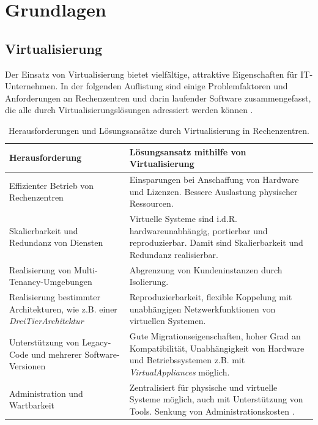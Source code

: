 \documentclass[../main.tex]{subfiles}
\begin{document}
\chapter{Grundlagen}
\label{basics}

	\section{Virtualisierung}
  \label{introVirt}
		Der Einsatz von Virtualisierung bietet vielfältige, attraktive Eigenschaften für \acrshort{IT}-Unternehmen. In der folgenden Auflistung sind einige Problemfaktoren und Anforderungen an Rechenzentren und darin laufender Software zusammengefasst, die alle durch Virtualisierungslösungen adressiert werden können \cite[S.1]{bsiVirt}\cite[S.662,672f.]{tanenbaumOS}\cite[S.299]{mandlOS}.

		\vspace{0.5cm}
		\begin{table}[h!]
			\begin{centering}
			\begin{tabularx}{\textwidth}{>{\hsize=1\hsize}X|>{\hsize=1\hsize}X}
				\hline
				\textbf{Herausforderung} & \textbf{Lösungsansatz mithilfe von Virtualisierung} \\
				\hline
				Effizienter Betrieb von Rechenzentren
				& Einsparungen bei Anschaffung von Hardware und Lizenzen. Bessere Auslastung physischer Ressourcen. \\
				\hline
				Skalierbarkeit und Redundanz von Diensten
				& Virtuelle Systeme sind i.d.R. hardwareunabhängig, portierbar und reproduzierbar. Damit sind Skalierbarkeit und Redundanz realisierbar. \\
				\hline
				Realisierung von Multi-Tenancy-Umgebungen
				& Abgrenzung von Kundeninstanzen durch Isolierung. \\
				\hline
				Realisierung bestimmter Architekturen, wie z.B. einer \emph{\gls{DreiTierArchitektur}}
				& Reproduzierbarkeit, flexible Koppelung mit unabhängigen Netzwerkfunktionen von virtuellen Systemen. \\
				\hline
				Unterstützung von Legacy-Code und mehrerer Software-Versionen
				& Gute Migrationseigenschaften, hoher Grad an Kompatibilität, Unabhängigkeit von Hardware und Betriebssystemen z.B. mit \emph{\glspl{VirtualAppliance}} möglich.\\
				\hline
				Administration und Wartbarkeit
				& Zentralisiert für physische und virtuelle Systeme möglich, auch mit Unterstützung von Tools. Senkung von Administrationskosten \cite[S.1]{bsiVirt}\cite[S.661]{tanenbaumOS}. \\
				\hline
			\end{tabularx}
			\vspace{0.5cm}
			\caption{Herausforderungen und Lösungsansätze durch Virtualisierung in Rechenzentren.}
			\label{tab:virtAdvantages}
			\end{centering}
		\end{table}
\end{document}

